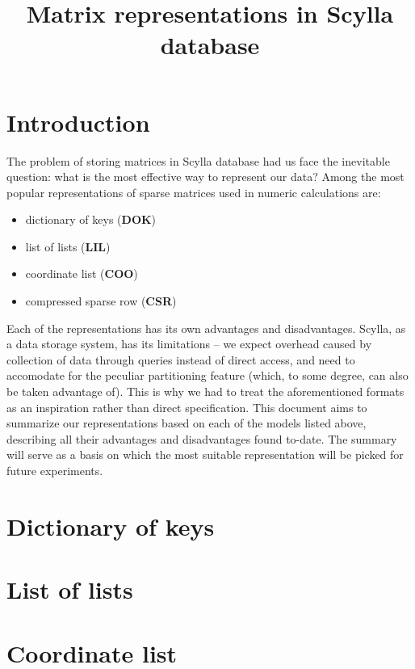 \documentclass{article}
\begin{document}
\thispagestyle{empty}\phantom{m} \vspace{4em}

\title{Matrix representations in Scylla database}
\date{}
\author{}
\maketitle

\section*{Introduction}
The problem of storing matrices in Scylla database had us face the inevitable question: what is the most effective way to represent our data? 
Among the most popular representations of sparse matrices used in numeric calculations are:
\begin{itemize}
\item dictionary of keys (\textbf{DOK})
\item list of lists (\textbf{LIL})
\item coordinate list (\textbf{COO})
\item compressed sparse row (\textbf{CSR})
\end{itemize}
Each of the representations has its own advantages and disadvantages. Scylla, as a data storage system, has its limitations – we expect overhead caused by collection of data through queries instead of direct access, and need to accomodate for the peculiar partitioning feature (which, to some degree, can also be taken advantage of). This is why we had to treat the aforementioned formats as an inspiration rather than direct specification. This document aims to summarize our representations based on each of the models listed above, describing all their advantages and disadvantages found to-date. The summary will serve as a basis on which the most suitable representation will be picked for future experiments.

\pagebreak
\section{Dictionary of keys}

\pagebreak
\section{List of lists}

\pagebreak
\section{Coordinate list}
\end{document}
